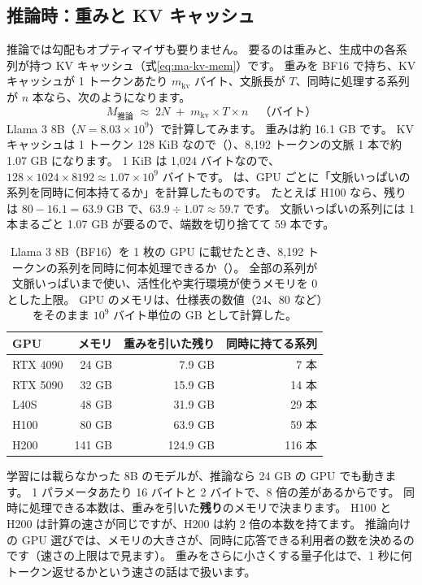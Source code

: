 \subsection*{推論時：重みと KV キャッシュ}

推論では勾配もオプティマイザも要りません。
要るのは重みと、生成中の各系列が持つ KV キャッシュ（式\eqref{eq:ma-kv-mem}）です。
重みを BF16 で持ち、KV キャッシュが 1 トークンあたり $m_{\text{kv}}$ バイト、文脈長が $T$、同時に処理する系列が $n$ 本なら、次のようになります。
\begin{equation}
M_{\text{推論}} \;\approx\; 2N \;+\; m_{\text{kv}} \times T \times n \quad\text{（バイト）}
\label{eq:infra-infer-mem}
\end{equation}
Llama 3 8B（$N=8.03\times10^{9}$）で計算してみます。
重みは約 16.1 GB です。
KV キャッシュは 1 トークン 128 KiB なので（）、8,192 トークンの文脈 1 本で約 1.07 GB になります。
1 KiB は 1,024 バイトなので、$128\times1024\times8192\approx1.07\times10^{9}$ バイトです。
は、GPU ごとに「文脈いっぱいの系列を同時に何本持てるか」を計算したものです。
たとえば H100 なら、残りは $80-16.1=63.9$ GB で、$63.9\div1.07\approx59.7$ です。
文脈いっぱいの系列には 1 本まるごと 1.07 GB が要るので、端数を切り捨てて 59 本です。

\begin{table}[tbp]
\centering
\caption{Llama 3 8B（BF16）を 1 枚の GPU に載せたとき、8,192 トークンの系列を同時に何本処理できるか（）。
全部の系列が文脈いっぱいまで使い、活性化や実行環境が使うメモリを 0 とした上限。
GPU のメモリは、仕様表の数値（24、80 など）をそのまま $10^{9}$ バイト単位の GB として計算した。}
\label{tab:infra-infer}
\footnotesize
\begin{tabular}{lrrr}
\toprule
GPU & メモリ & 重みを引いた残り & 同時に持てる系列 \\
\midrule
RTX 4090 & 24 GB & 7.9 GB & 7 本 \\
RTX 5090 & 32 GB & 15.9 GB & 14 本 \\
L40S & 48 GB & 31.9 GB & 29 本 \\
H100 & 80 GB & 63.9 GB & 59 本 \\
H200 & 141 GB & 124.9 GB & 116 本 \\
\bottomrule
\end{tabular}
\end{table}

学習には載らなかった 8B のモデルが、推論なら 24 GB の GPU でも動きます。
1 パラメータあたり 16 バイトと 2 バイトで、8 倍の差があるからです。
同時に処理できる本数は、重みを引いた\textbf{残り}のメモリで決まります。
H100 と H200 は計算の速さが同じですが、H200 は約 2 倍の本数を持てます。
推論向けの GPU 選びでは、メモリの大きさが、同時に応答できる利用者の数を決めるのです（速さの上限はで見ます）。
重みをさらに小さくする量子化はで、1 秒に何トークン返せるかという速さの話はで扱います。

